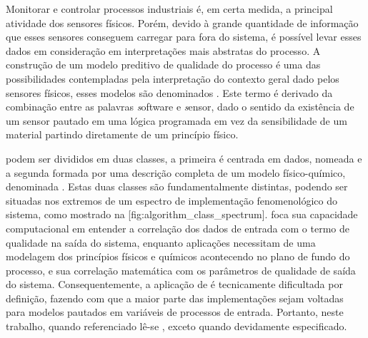 \startsection[title={Modelagem matemática}]
	Monitorar e controlar processos industriais é, em certa medida, a principal atividade dos sensores físicos. Porém, devido à grande quantidade de informação que esses sensores conseguem carregar para fora do sistema, é possível levar esses dados em consideração em interpretações mais abstratas do processo. A construção de um modelo preditivo de qualidade do processo é uma das possibilidades contempladas pela interpretação do contexto geral dado pelos sensores físicos, esses modelos são denominados \plural{\getbuffer[sens]}. Este termo é derivado da combinação entre as palavras {\emph software} e {\emph sensor}, dado o sentido da existência de um sensor pautado em uma lógica programada em vez da sensibilidade de um material partindo diretamente de um princípio físico.

	\Word{\plural{\getbuffer[sens]}} podem ser divididos em duas classes, a primeira é centrada em dados, nomeada \getbuffer[data] e a segunda formada por uma descrição completa de um modelo físico-químico, denominada \getbuffer[model]. Estas duas classes são fundamentalmente distintas, podendo ser situadas nos extremos de um espectro de implementação fenomenológico do sistema, como mostrado na [fig:algorithm_class_spectrum]. \Word{\getbuffer[data]} foca sua capacidade computacional em entender a correlação dos dados de entrada com o termo de qualidade na saída do sistema, enquanto aplicações \getbuffer[model] necessitam de uma modelagem dos princípios físicos e químicos acontecendo no plano de fundo do processo, e sua correlação matemática com os parâmetros de qualidade de saída do sistema. Consequentemente, a aplicação de \getbuffer[model] \getbuffer[sens] é tecnicamente dificultada por definição, fazendo com que a maior parte das implementações sejam voltadas para modelos pautados em variáveis de processos de entrada. Portanto, neste trabalho, quando referenciado \getbuffer[sens] lê-se \getbuffer[data] \getbuffer[sens], exceto quando devidamente especificado.

	\startplacefigure[title={Espectro da classificação dos algoritmos baseados em modelo ou em dados}, reference={fig:algorithm_class_spectrum}]
	\stopplacefigure

